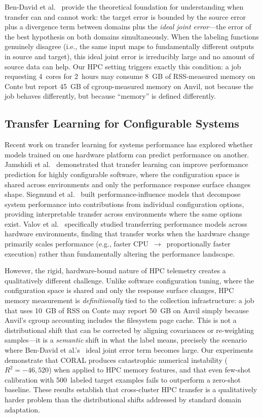 \documentclass[sigconf]{acmart}
\begin{document}
Ben-David et al.~\cite{ben_david2010theory} provide the theoretical foundation for understanding when transfer can and cannot work: the target error is bounded by the source error plus a divergence term between domains plus the \emph{ideal joint error}---the error of the best hypothesis on both domains simultaneously.
When the labeling functions genuinely disagree (i.e., the same input maps to fundamentally different outputs in source and target), this ideal joint error is irreducibly large and no amount of source data can help.
Our HPC setting triggers exactly this condition: a job requesting 4~cores for 2~hours may consume 8~GB of RSS-measured memory on Conte but report 45~GB of cgroup-measured memory on Anvil, not because the job behaves differently, but because ``memory'' is defined differently.

\subsection{Transfer Learning for Configurable Systems}

Recent work on transfer learning for systems performance has explored whether models trained on one hardware platform can predict performance on another.
Jamshidi et al.~\cite{jamshidi_transfer_2017} demonstrated that transfer learning can improve performance prediction for highly configurable software, where the configuration space is shared across environments and only the performance response surface changes shape.
Siegmund et al.~\cite{siegmund2015performance} built performance-influence models that decompose system performance into contributions from individual configuration options, providing interpretable transfer across environments where the same options exist.
Valov et al.~\cite{valov2017transferring} specifically studied transferring performance models across hardware environments, finding that transfer works when the hardware change primarily scales performance (e.g., faster CPU~$\to$~proportionally faster execution) rather than fundamentally altering the performance landscape.

However, the rigid, hardware-bound nature of HPC telemetry creates a qualitatively different challenge.
Unlike software configuration tuning, where the configuration space is shared and only the response surface changes, HPC memory measurement is \emph{definitionally} tied to the collection infrastructure: a job that uses 10~GB of RSS on Conte may report 50~GB on Anvil simply because Anvil's cgroup accounting includes the filesystem page cache.
This is not a distributional shift that can be corrected by aligning covariances or re-weighting samples---it is a \emph{semantic} shift in what the label means, precisely the scenario where Ben-David et al.'s~\cite{ben_david2010theory} ideal joint error term becomes large.
Our experiments demonstrate that CORAL produces catastrophic numerical instability ($R^2 = -46{,}520$) when applied to HPC memory features, and that even few-shot calibration with 500~labeled target examples fails to outperform a zero-shot baseline.
These results establish that cross-cluster HPC transfer is a qualitatively harder problem than the distributional shifts addressed by standard domain adaptation.
\end{document}

